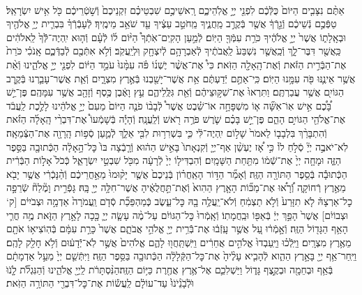 \documentclass[twoside, openany, parskip=half, 11pt]{book}
\begin{document}
\begin{sometimes}
\begin{footnotesize}
\begin{multicols}{2}
\\
אַתֶּ֨ם נִצָּבִ֤ים הַיּוֹם֙ כֻּלְּֿכֶ֔ם לִפְנֵ֖י יְיָ֣ אֱלֹֽהֵיכֶ֑ם רָֽאשֵׁיכֶ֣ם שִׁבְטֵיכֶ֗ם זִקְנֵיכֶם֙ וְֿשֹׁ֣טְֿרֵיכֶ֔ם כֹּ֖ל אִ֥ישׁ יִשְׂרָאֵֽל׃ טַפְּֿכֶ֣ם נְֿשֵׁיכֶ֔ם וְֿגֵ֣רְֿךָ֔ אֲשֶׁ֖ר בְּֿקֶרֶ֣ב מַֽחֲנֶ֑יךָ מֵֽחֹטֵ֣ב עֵצֶ֔יךָ עַ֖ד שֹׁאֵ֥ב מֵימֶֽיךָ׃ לְֿעָבְֿרְֿךָ֗ בִּבְרִ֛ית יְיָ֥ אֱלֹהֶ֖יךָ וּבְאָֽלָת֑וֹ אֲשֶׁר֙ יְיָ֣ אֱלֹהֶ֔יךָ כֹּרֵ֥ת עִמְּֿךָ֖ הַיּֽוֹם׃
לְֿמַ֣עַן הָקִֽים־אֹֽתְֿךָ֩ הַיּ֨וֹם ל֜וֹ לְֿעָ֗ם וְֿה֤וּא יִֽהְיֶה־לְּֿֿךָ֙ לֵֽאלֹהִ֔ים כַּֽאֲשֶׁ֖ר דִּבֶּר־לָ֑ךְ וְֿכַֽאֲשֶׁ֤ר נִשְׁבַּע֙ לַֽאֲבֹתֶ֔יךָ לְֿאַבְרָהָ֥ם לְֿיִצְחָ֖ק וּֽלְיַֽעֲקֹֽב׃ וְֿלֹ֥א אִתְּֿכֶ֖ם לְֿבַדְּֿכֶ֑ם אָֽנֹכִ֗י כֹּרֵת֙ אֶת־הַבְּֿרִ֣ית הַזֹּ֔את וְֿאֶת־הָֽאָלָ֖ה הַזֹּֽאת׃ כִּי֩ אֶת־אֲשֶׁ֨ר יֶשְׁנ֜וֹ פֹּ֗ה עִמָּ֨נוּ֙ עֹמֵ֣ד הַיּ֔וֹם לִפְנֵ֖י יְיָ֣ אֱלֹהֵ֑ינוּ וְֿאֵ֨ת אֲשֶׁ֥ר אֵינֶ֛נּוּ פֹּ֖ה עִמָּ֥נוּ הַיּֽוֹם׃
כִּֽי־אַתֶּ֣ם יְֿדַעְתֶּ֔ם אֵ֥ת אֲשֶׁר־יָשַׁ֖בְנוּ בְּֿאֶ֣רֶץ מִצְרָ֑יִם וְֿאֵ֧ת אֲשֶׁר־עָבַ֛רְנוּ בְּֿקֶ֥רֶב הַגּוֹיִ֖ם אֲשֶׁ֥ר עֲבַרְתֶּֽם׃ וַתִּרְאוּ֙ אֶת־שִׁקּ֣וּצֵיהֶ֔ם וְֿאֵ֖ת גִּלֻּֽלֵיהֶ֑ם עֵ֣ץ וָאֶ֔בֶן כֶּ֥סֶף וְֿזָהָ֖ב אֲשֶׁ֥ר עִמָּהֶֽם׃ פֶּן־יֵ֣שׁ בָּ֠כֶ֠ם אִ֣ישׁ אֽוֹ־אִשָּׁ֞ה א֧וֹ מִשְׁפָּחָ֣ה אוֹ־שֵׁ֗בֶט אֲשֶׁר֩ לְֿבָב֨וֹ פֹנֶ֤ה הַיּוֹם֙ מֵעִם֙ יְיָ֣ אֱלֹהֵ֔ינוּ לָלֶ֣כֶת לַֽעֲבֹ֔ד אֶת־אֱלֹהֵ֖י הַגּוֹיִ֣ם הָהֵ֑ם פֶּן־יֵ֣שׁ בָּכֶ֗ם שֹׁ֛רֶשׁ פֹּרֶ֥ה רֹ֖אשׁ וְֿלַֽעֲנָֽה׃ וְֿהָיָ֡ה בְּֿשָׁמְֿעוֹ֩ אֶת־דִּבְרֵ֨י הָֽאָלָ֜ה הַזֹּ֗את וְֿהִתְבָּרֵ֨ךְ בִּלְבָב֤וֹ לֵאמֹר֙ שָׁל֣וֹם יִֽהְיֶה־לִּ֔י כִּ֛י בִּשְׁרִר֥וּת לִבִּ֖י אֵלֵ֑ךְ לְֿמַ֛עַן סְֿפ֥וֹת הָֽרָוָ֖ה אֶת־הַצְּֿמֵאָֽה׃ לֹֽא־יֹאבֶ֣ה יְיָ֘ סְֿלֹ֣חַ לוֹ֒ כִּ֣י אָ֠ז יֶעְשַׁ֨ן אַף־יְיָ֤ וְֿקִנְאָתוֹ֙ בָּאִ֣ישׁ הַה֔וּא וְֿרָ֤בְֿצָה בּוֹ֙ כׇּל־הָ֣אָלָ֔ה הַכְּֿתוּבָ֖ה בַּסֵּ֣פֶר הַזֶּ֑ה וּמָחָ֤ה יְיָ֙ אֶת־שְֿׁמ֔וֹ מִתַּ֖חַת הַשָּׁמָֽיִם׃ וְֿהִבְדִּיל֤וֹ יְיָ֙ לְֿרָעָ֔ה מִכֹּ֖ל שִׁבְטֵ֣י יִשְׂרָאֵ֑ל כְּֿכֹל֙ אָל֣וֹת הַבְּֿרִ֔ית הַכְּֿתוּבָ֕ה בְּֿסֵ֥פֶר הַתּוֹרָ֖ה הַזֶּֽה׃ וְֿאָמַ֞ר הַדּ֣וֹר הָאַֽחֲר֗וֹן בְּֿנֵיכֶם֙ אֲשֶׁ֤ר יָק֨וּמוּ֙ מֵאַ֣חֲרֵיכֶ֔ם וְֿהַ֨נָּכְֿרִ֔י אֲשֶׁ֥ר יָבֹ֖א מֵאֶ֣רֶץ רְֿחוֹקָ֑ה וְֿ֠רָא֠וּ אֶת־מַכּ֞וֹת הָאָ֤רֶץ הַהִוא֙ וְֿאֶת־תַּ֣חֲלֻאֶ֔יהָ אֲשֶׁר־חִלָּ֥ה יְיָ֖ בָּֽהּ׃ גָּפְֿרִ֣ית וָמֶ֘לַח֘ שְֿׂרֵפָ֣ה כׇל־אַרְצָהּ֒ לֹ֤א תִזָּרַע֙ וְֿלֹ֣א תַצְמִ֔חַ וְֿלֹא־יַֽעֲלֶ֥ה בָ֖הּ כׇּל־עֵ֑שֶׂב כְּֽֿמַהְפֵּכַ֞ת סְֿדֹ֤ם וַֽעֲמֹרָה֙ אַדְמָ֣ה וּצְבֹיִי֔ם [ק‘ וּצְבוֹיִ֔ם] אֲשֶׁר֙ הָפַ֣ךְ יְיָ֔ בְּֿאַפּ֖וֹ וּבַֽחֲמָתֽוֹ׃ וְֿאָֽמְֿרוּ֙ כׇּל־הַגּוֹיִ֔ם עַל־מֶ֨ה עָשָׂ֧ה יְיָ֛ כָּ֖כָה לָאָ֣רֶץ הַזֹּ֑את מֶ֥ה חֳרִ֛י הָאַ֥ף הַגָּד֖וֹל הַזֶּֽה׃ וְֿאָ֣מְֿר֔וּ עַ֚ל אֲשֶׁ֣ר עָֽזְֿב֔וּ אֶת־בְּֿֿרִ֥ית יְיָ֖ אֱלֹהֵ֣י אֲבֹתָ֑ם אֲשֶׁר֙ כָּרַ֣ת עִמָּ֔ם בְּֿהֽוֹצִיא֥וֹ אֹתָ֖ם מֵאֶ֥רֶץ מִצְרָֽיִם׃ וַיֵּֽלְֿכ֗וּ וַיַּֽעַבְדוּ֙ אֱלֹהִ֣ים אֲחֵרִ֔ים וַיִּֽשְׁתַּֽחֲו֖וּ לָהֶ֑ם אֱלֹהִים֙ אֲשֶׁ֣ר לֹֽא־יְֿֿדָע֔וּם וְֿלֹ֥א חָלַ֖ק לָהֶֽם׃ וַיִּֽחַר־אַ֥ף יְיָ֖ בָּאָ֣רֶץ הַהִ֑וא לְֿהָבִ֤יא עָלֶ֨יהָ֙ אֶת־כׇּל־הַקְּֿלָלָ֔ה הַכְּֿתוּבָ֖ה בַּסֵּ֥פֶר הַזֶּֽה׃ וַיִּתְּֿשֵׁ֤ם יְיָ֙ מֵעַ֣ל אַדְמָתָ֔ם בְּֿאַ֥ף וּבְחֵמָ֖ה וּבְקֶ֣צֶף גָּד֑וֹל וַיַּשְׁלִכֵ֛ם אֶל־אֶ֥רֶץ אֲחֶ֖רֶת כַּיּ֥וֹם הַזֶּֽה׃הַנִּ֨סְתָּרֹ֔ת לַֽיְיָ֖ אֱלֹהֵ֑ינוּ וְֿהַנִּגְלֹ֞ת לָֹ֤נֹוֹּ וֹּלְֹֿבָֹנֵֹ֨יֹנֹוֹּ֙ עַד־עוֹלָ֔ם לַֽעֲשׂ֕וֹת אֶת־כׇּל־דִּבְרֵ֖י הַתּוֹרָ֥ה הַזֹּֽאת׃


\end{multicols}
\end{footnotesize}
\end{sometimes}
\end{document}
